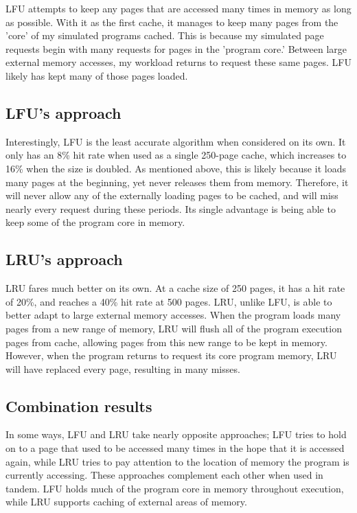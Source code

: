 \documentclass[paper=a4, fontsize=11pt]{scrartcl} %
\numberwithin{equation}{section} %
\numberwithin{figure}{section} %
\numberwithin{table}{section} %
\begin{document}
LFU attempts to keep any pages that are accessed many times in memory as long as possible. With it as the first cache, it manages to keep many pages from the 'core' of my simulated programs cached. This is because my simulated page requests begin with many requests for pages in the 'program core.' Between large external memory accesses, my workload returns to request these same pages. LFU likely has kept many of those pages loaded. 

\subsection{LFU's approach}
Interestingly, LFU is the least accurate algorithm when considered on its own. It only has an 8\% hit rate when used as a single 250-page cache, which increases to 16\% when the size is doubled. As mentioned above, this is likely because it loads many pages at the beginning, yet never releases them from memory. Therefore, it will never allow any of the externally loading pages to be cached, and will miss nearly every request during these periods. Its single advantage is being able to keep some of the program core in memory.

\subsection{LRU's approach}
LRU fares much better on its own. At a cache size of 250 pages, it has a hit rate of 20\%, and reaches a 40\% hit rate at 500 pages. LRU, unlike LFU, is able to better adapt to large external memory accesses. When the program loads many pages from a new range of memory, LRU will flush all of the program execution pages from cache, allowing pages from this new range to be kept in memory. However, when the program returns to request its core program memory, LRU will have replaced every page, resulting in many misses.

\subsection{Combination results}
In some ways, LFU and LRU take nearly opposite approaches; LFU tries to hold on to a page that used to be accessed many times in the hope that it is accessed again, while LRU tries to pay attention to the location of memory the program is currently accessing. These approaches complement each other when used in tandem. LFU holds much of the program core in memory throughout execution, while LRU supports caching of external areas of memory.
\end{document}
